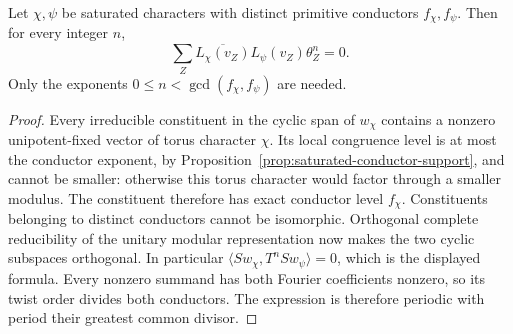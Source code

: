 \begin{corollary}
\label{cor:saturated-cross-moments}
Let $\chi,\psi$ be saturated characters with distinct primitive
conductors $f_\chi,f_\psi$. Then for every integer $n$,
\begin{equation}\label{eq:saturated-cross-moments}
 \sum_Z\overline{L_\chi(v_Z)}L_\psi(v_Z)\theta_Z^n=0.
\end{equation}
Only the exponents $0\le n<\gcd(f_\chi,f_\psi)$ are needed.
\end{corollary}
\begin{proof}
Every irreducible constituent in the cyclic span of $w_\chi$ contains
a nonzero unipotent-fixed vector of torus character $\chi$. Its local
congruence level is at most the conductor exponent, by
Proposition~\ref{prop:saturated-conductor-support}, and cannot be smaller:
otherwise this torus character would factor through a smaller modulus.
The constituent therefore has exact conductor level $f_\chi$.
Constituents belonging to distinct conductors cannot be isomorphic.
Orthogonal complete reducibility of the unitary modular representation
now makes the two cyclic subspaces orthogonal. In particular
$\langle Sw_\chi,T^nSw_\psi\rangle=0$, which is the displayed formula.
Every nonzero summand has both Fourier coefficients nonzero, so its
twist order divides both conductors. The expression is therefore
periodic with period their greatest common divisor.
\end{proof}
